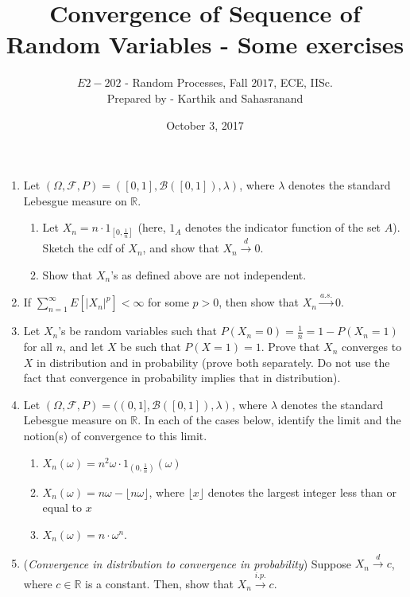 \documentclass[10pt]{article}
\title {\sc Convergence of Sequence of Random Variables - Some exercises}
\author{$E2-202$ - Random Processes, Fall $2017$, ECE, IISc.\\Prepared by - Karthik and Sahasranand}
\date{October 3, 2017}
\begin{document}
\maketitle 

\begin{enumerate}
\item Let $(\Omega,\mathcal{F},P)=([0,1],\mathcal{B}([0,1]),\lambda)$, where $\lambda$ denotes the standard Lebesgue measure on $\mathbb{R}$.
\begin{enumerate}
	\item Let $X_{n}=n\cdot 1_{\left[0,\frac{1}{n}\right]}$ (here, $1_{A}$ denotes the indicator function of the set $A$). Sketch the cdf of $X_{n}$, and show that $X_{n}\stackrel{d}{\longrightarrow}0$. 
	\item Show that $X_{n}$'s as defined above are not independent.
\end{enumerate}

\item If $\sum\limits_{n=1}^{\infty}E[|X_{n}|^{p}]<\infty$ for some $p>0$, then show that $X_{n}\stackrel{a.s.}{\longrightarrow}0$.

\item Let $ X_n $'s be random variables such that $ P(X_n = 0) = \frac{1}{n} = 1 - P(X_n = 1) $ for all $ n $, and let $ X $ be such that
$ P(X = 1) = 1 $. Prove that $X_{n}$ converges to $X$ in distribution and in probability (prove both separately. Do not use the fact that convergence in probability implies that in distribution).

\item Let $(\Omega,\mathcal{F},P)=((0,1],\mathcal{B}([0,1]),\lambda)$, where $\lambda$ denotes the standard Lebesgue measure on $\mathbb{R}$. In each of the cases below, identify the limit and the notion(s) of convergence to this limit.
\begin{enumerate}
	\item $X_{n}(\omega)=n^{2}\omega\cdot 1_{\left(0,\frac{1}{n}\right)}(\omega)$
	\item $X_{n}(\omega)=n\omega-\lfloor n\omega\rfloor$, where $\lfloor x \rfloor$ denotes the largest integer less than or equal to $x$
	\item $X_{n}(\omega)=n\cdot \omega^{n}$.
\end{enumerate}
\item (\emph{Convergence in distribution to convergence in probability}) Suppose $X_{n}\stackrel{d}{\longrightarrow}c$, where $c\in \mathbb{R}$ is a constant. Then, show that $X_{n}\stackrel{i.p.}{\longrightarrow}c$.


\end{enumerate}
\end{document}
